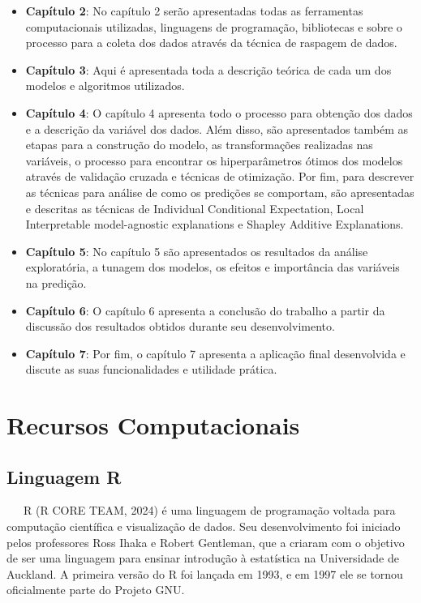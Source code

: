 \documentclass[
  12pt,
  a4paper,
]{scrreprt}
\begin{document}
\begin{itemize}
\item
  \textbf{Capítulo 2}: No capítulo 2 serão apresentadas todas as
  ferramentas computacionais utilizadas, linguagens de programação,
  bibliotecas e sobre o processo para a coleta dos dados através da
  técnica de raspagem de dados.
\item
  \textbf{Capítulo 3}: Aqui é apresentada toda a descrição teórica de
  cada um dos modelos e algoritmos utilizados.
\item
  \textbf{Capítulo 4}: O capítulo 4 apresenta todo o processo para
  obtenção dos dados e a descrição da variável dos dados. Além disso,
  são apresentados também as etapas para a construção do modelo, as
  transformações realizadas nas variáveis, o processo para encontrar os
  hiperparâmetros ótimos dos modelos através de validação cruzada e
  técnicas de otimização. Por fim, para descrever as técnicas para
  análise de como os predições se comportam, são apresentadas e
  descritas as técnicas de Individual Conditional Expectation, Local
  Interpretable model-agnostic explanations e Shapley Additive
  Explanations.
\item
  \textbf{Capítulo 5}: No capítulo 5 são apresentados os resultados da
  análise exploratória, a tunagem dos modelos, os efeitos e importância
  das variáveis na predição.
\item
  \textbf{Capítulo 6}: O capítulo 6 apresenta a conclusão do trabalho a
  partir da discussão dos resultados obtidos durante seu
  desenvolvimento.
\item
  \textbf{Capítulo 7}: Por fim, o capítulo 7 apresenta a aplicação final
  desenvolvida e discute as suas funcionalidades e utilidade prática.
\end{itemize}

\newpage

\chapter{Recursos Computacionais}\label{recursos-computacionais}

\section{Linguagem R}\label{linguagem-r}

~~~R (R CORE TEAM, 2024) é uma linguagem de programação voltada para
computação científica e visualização de dados. Seu desenvolvimento foi
iniciado pelos professores Ross Ihaka e Robert Gentleman, que a criaram
com o objetivo de ser uma linguagem para ensinar introdução à
estatística na Universidade de Auckland. A primeira versão do R foi
lançada em 1993, e em 1997 ele se tornou oficialmente parte do Projeto
GNU.
\end{document}
